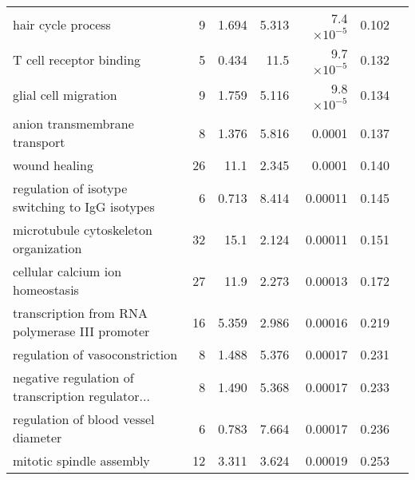 \begin{longtable}{|l|r|r|r|r|r|}
                                hair cycle process &                       9 &                   1.694 &      5.313 &  7.4$\times 10^{-5}$ &                        0.102~~ \\
                           T cell receptor binding &                       5 &                   0.434 &       11.5 &  9.7$\times 10^{-5}$ &                        0.132~~ \\
                              glial cell migration &                       9 &                   1.759 &      5.116 &  9.8$\times 10^{-5}$ &                        0.134~~ \\
                     anion transmembrane transport &                       8 &                   1.376 &      5.816 &               0.0001 &                        0.137~~ \\
                                     wound healing &                      26 &                    11.1 &      2.345 &               0.0001 &                        0.140~~ \\
   regulation of isotype switching to IgG isotypes &                       6 &                   0.713 &      8.414 &              0.00011 &                        0.145~~ \\
             microtubule cytoskeleton organization &                      32 &                    15.1 &      2.124 &              0.00011 &                        0.151~~ \\
                  cellular calcium ion homeostasis &                      27 &                    11.9 &      2.273 &              0.00013 &                        0.172~~ \\
    transcription from RNA polymerase III promoter &                      16 &                   5.359 &      2.986 &              0.00016 &                        0.219~~ \\
                    regulation of vasoconstriction &                       8 &                   1.488 &      5.376 &              0.00017 &                        0.231~~ \\
 negative regulation of transcription regulator... &                       8 &                   1.490 &      5.368 &              0.00017 &                        0.233~~ \\
               regulation of blood vessel diameter &                       6 &                   0.783 &      7.664 &              0.00017 &                        0.236~~ \\
                          mitotic spindle assembly &                      12 &                   3.311 &      3.624 &              0.00019 &                        0.253~~ \\

\end{longtable}
